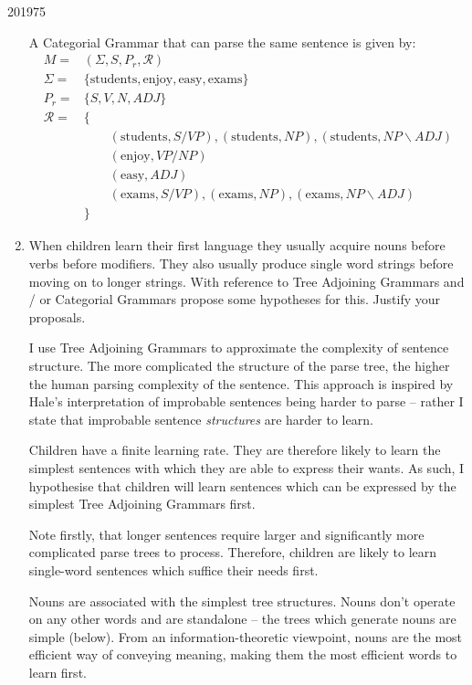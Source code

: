 \documentclass[10pt,\jkfside,a4paper]{article}
\newcommand{\np}{\ensuremath{N\!P}}
\newcommand{\vp}{\ensuremath{V\!P}}
\newcommand{\adj}{\ensuremath{ADJ}}
\begin{document}
\begin{examquestion}{2019}{7}{5}
\begin{enumerate}[label=(\alph*)]
A Categorial Grammar that can parse the same sentence is given by:
\begin{align*}
M =& (\Sigma, S, P_r, \mathcal R) \\
\Sigma =& \{\text{students}, \text{enjoy}, \text{easy}, \text{exams}\} \\
P_r =& \{S, V, N, \adj\} \\
\mathcal R =& \{\\
&\qquad (\text{students}, S/\vp), (\text{students}, \np), (\text{students},
\np\backslash\adj) \\
&\qquad (\text{enjoy}, \vp/\np) \\
&\qquad (\text{easy}, \adj) \\
&\qquad (\text{exams}, S/\vp), (\text{exams}, \np), (\text{exams}, \np\backslash\adj)\\
&\}
\end{align*}

\item When children learn their first language they usually acquire nouns
before verbs before modifiers. They also usually produce single word strings
before moving on to longer strings. With reference to Tree Adjoining Grammars
and / or Categorial Grammars propose some hypotheses for this. Justify your
proposals.

I use Tree Adjoining Grammars to approximate the complexity of sentence
structure. The more complicated the structure of the parse tree, the higher
the human parsing complexity of the sentence. This approach is inspired by
Hale's interpretation of improbable sentences being harder to parse --
rather I state that improbable sentence \textit{structures} are harder to
learn.

Children have a finite learning rate. They are therefore likely to learn the
simplest sentences with which they are able to express their wants. As such,
I hypothesise that children will learn sentences which can be expressed by
the simplest Tree Adjoining Grammars first.

Note firstly, that longer sentences require larger and significantly more
complicated parse trees to process. Therefore, children are likely to learn
single-word sentences which suffice their needs first.

Nouns are associated with the simplest tree structures. Nouns don't operate
on any other words and are standalone -- the trees which generate nouns are
simple (below). From an information-theoretic viewpoint, nouns are the most
efficient way of conveying meaning, making them the most efficient words to
learn first.
\tikzset{
node distance = 1cm
}
\begin{figure}[H]
\centering
{}
\end{figure}


\end{enumerate}
\end{examquestion}
\end{document}
